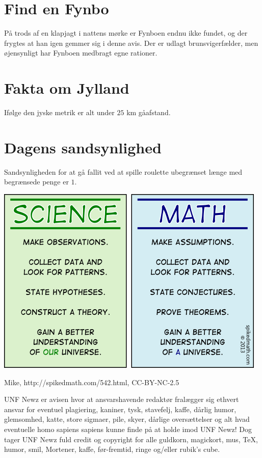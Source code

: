 \begin{minipage}[b]{0.95\linewidth}
\begin{minipage}[t]{0.47\textwidth}
\section*{Find en Fynbo}
På trods af en klapjagt i nattens mørke er Fynboen endnu ikke fundet, og der frygtes at han igen gemmer sig i denne avis. Der er udlagt brunsvigerfælder, men øjensynligt har Fynboen medbragt egne rationer.

\section*{Fakta om Jylland}
Ifølge den jyske metrik er alt under $25$ km gåafstand.

\section*{Dagens sandsynlighed}
Sandsynligheden for at gå fallit ved at spille roulette ubegrænset længe med begrænsede penge er $1$.

\vspace{3mm}
\end{minipage}

\includegraphics[width=\textwidth]{542-science-vs-math.png}
\begin{center}
\tiny Mike, http://spikedmath.com/542.html, CC-BY-NC-2.5

\vspace{3mm}

\tiny UNF Newz er avisen hvor at ansvarshavende redaktør fralægger sig ethvert ansvar for eventuel plagiering, kaniner, tysk, stavefelj, kaffe, dårlig humor, glemsomhed, katte, store sigmaer, pile, skyer, dårlige oversættelser og alt hvad eventuelle homo sapiens sapiens kunne finde på at holde imod UNF Newz! Dog tager UNF Newz fuld credit og copyright for alle guldkorn, magickort, mus, \TeX, humor, smil, Mortener, kaffe, før-fremtid, ringe og/eller rubik's cube.
\end{center}
\end{minipage}

